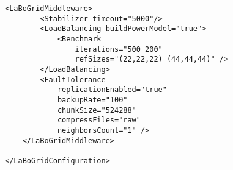 \begin{Verbatim}[tabsize=2,frame=lines]
	<LaBoGridMiddleware>
		<Stabilizer timeout="5000"/>
		<LoadBalancing buildPowerModel="true">
			<Benchmark
				iterations="500 200"
				refSizes="(22,22,22) (44,44,44)" />
		</LoadBalancing>
		<FaultTolerance
			replicationEnabled="true"
			backupRate="100"
			chunkSize="524288"
			compressFiles="raw"
			neighborsCount="1" />
	</LaBoGridMiddleware>

</LaBoGridConfiguration>
\end{Verbatim}
